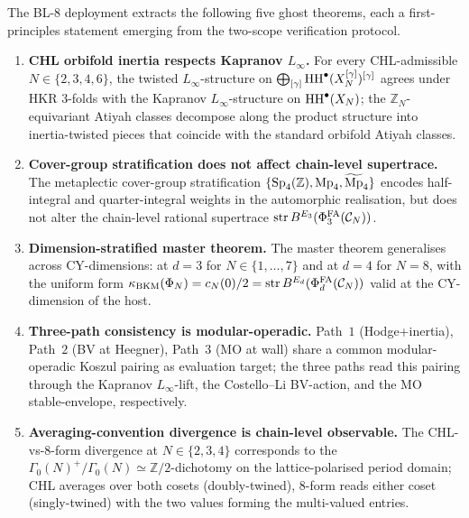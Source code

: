 The BL-$8$ deployment extracts the following five ghost theorems, each
a first-principles statement emerging from the two-scope verification
protocol.

\begin{enumerate}
\item[(G$2$.$1$)] \textbf{CHL orbifold inertia respects Kapranov
$L_\infty$.} For every CHL-admissible $N \in \{2, 3, 4, 6\}$, the
twisted $L_\infty$-structure on
$\bigoplus_{[\gamma]} \mathrm{HH}^\bullet(X_N^{[\gamma]})^{[\gamma]}$ agrees
under HKR $3$-folds with the Kapranov $L_\infty$-structure on
$\mathrm{HH}^\bullet(X_N)$; the $\mathbb{Z}_N$-equivariant Atiyah classes
decompose along the product structure into inertia-twisted pieces that
coincide with the standard orbifold Atiyah classes.

\item[(G$3$.$1$)] \textbf{Cover-group stratification does not affect
chain-level supertrace.} The metaplectic cover-group stratification
$\{\mathrm{Sp}_{4}(\mathbb{Z}), \mathrm{Mp}_{4}, \widetilde{\mathrm{Mp}}_{4}\}$ encodes half-integral and
quarter-integral weights in the automorphic realisation, but does not
alter the chain-level rational supertrace
$\mathrm{str}\,B^{E_{3}}(\Phi^{\mathrm{FA}}_{3}(\mathcal{C}_N))$.

\item[(G$3$.$2$)] \textbf{Dimension-stratified master theorem.} The
master theorem generalises across CY-dimensions: at $d = 3$ for
$N \in \{1, \dots, 7\}$ and at $d = 4$ for $N = 8$, with the uniform
form
$\kappa_{\mathrm{BKM}}(\Phi_N) = c_N(0)/2 = \mathrm{str}\,B^{E_{d}}(\Phi^{\mathrm{FA}}_d(\mathcal{C}_N))$
valid at the CY-dimension of the host.

\item[(G$4$.$2$)] \textbf{Three-path consistency is
modular-operadic.} Path~$1$ (Hodge+inertia), Path~$2$ (BV at Heegner),
Path~$3$ (MO at wall) share a common modular-operadic Koszul pairing
as evaluation target; the three paths read this pairing through the
Kapranov $L_\infty$-lift, the Costello--Li BV-action, and the MO
stable-envelope, respectively.

\item[(G$5$.$2$)] \textbf{Averaging-convention divergence is
chain-level observable.} The CHL-vs-8-form divergence at $N \in
\{2, 3, 4\}$ corresponds to the $\Gamma_0(N)^+ / \Gamma_0(N) \simeq
\mathbb{Z}/2$-dichotomy on the lattice-polarised period domain; CHL
averages over both cosets (doubly-twined), 8-form reads either coset
(singly-twined) with the two values forming the multi-valued entries.
\end{enumerate}

